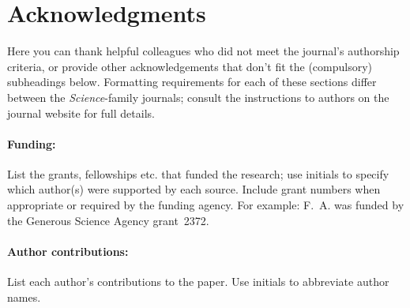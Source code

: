 \documentclass[12pt]{article}
\begin{document}

\clearpage %

%


%
%
%
%
%
%



\section*{Acknowledgments}
Here you can thank helpful colleagues who did not meet the journal's authorship criteria, or
provide other acknowledgements that don't fit the (compulsory) subheadings below.
Formatting requirements for each of these sections differ between the \textit{Science}-family
journals; consult the instructions to authors on the journal website for full details.
\paragraph*{Funding:}
List the grants, fellowships etc. that funded the research;
use initials to specify which author(s) were supported by each source.
Include grant numbers when appropriate or required by the funding agency.
For example: F.~A. was funded by the Generous Science Agency grant~2372.
\paragraph*{Author contributions:}
List each author’s contributions to the paper.
Use initials to abbreviate author names.
\end{document}
